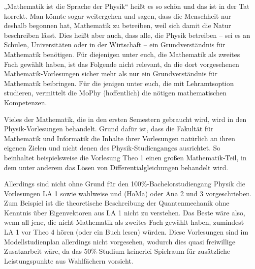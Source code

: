 „Mathematik ist die Sprache der Physik“ heißt es so schön und das ist in der Tat korrekt. Man könnte sogar weitergehen und sagen, dass die Menschheit nur deshalb begonnen hat, Mathematik zu betreiben, weil sich damit die Natur beschreiben lässt. Dies heißt aber auch, dass alle, die Physik betreiben -- sei es an Schulen, Universitäten oder in der Wirtschaft -- ein Grundverständnis für Mathematik benötigen. Für diejenigen unter euch, die Mathematik als zweites Fach gewählt haben, ist das Folgende nicht relevant, da die dort vorgesehenen Mathematik-Vorlesungen sicher mehr als nur ein Grundverständnis für Mathematik beibringen. Für die jenigen unter euch, die mit Lehramtsoption studieren, vermittelt die MoPhy (hoffentlich) die nötigen mathematischen Kompetenzen.

Vieles der Mathematik, die in den ersten Semestern gebraucht wird, wird in den Physik-Vorlesungen behandelt. Grund dafür ist, dass die Fakultät für Mathematik und Informatik die Inhalte ihrer Vorlesungen natürlich an ihren eigenen Zielen und nicht denen des Physik-Studienganges ausrichtet. So beinhaltet beispielsweise die Vorlesung \gls{Theo} 1 einen großen Mathematik-Teil, in dem unter anderem das Lösen von Differentialgleichungen behandelt wird.

Allerdings sind nicht ohne Grund für den 100\%-Bachelorstudiengang Physik die Vorlesungen \gls{LA} 1 sowie wahlweise  und  (\gls{HoMa}) oder \gls{Ana} 2 und 3 vorgeschrieben. Zum Beispiel ist die theoretische Beschreibung der Quantenmechanik ohne Kenntnis über Eigenvektoren aus \gls{LA} 1 nicht zu verstehen. Das Beste wäre also, wenn all jene, die nicht Mathematik als zweites Fach gewählt haben, zumindest \gls{LA} 1 vor \gls{Theo} 4 hören (oder ein Buch lesen) würden. Diese Vorlesungen sind im Modellstudienplan allerdings nicht vorgesehen, wodurch dies quasi freiwillige Zusatzarbeit wäre, da das 50\%-Studium keinerlei Spielraum für zusätzliche Leistungspunkte aus Wahlfächern vorsieht.
